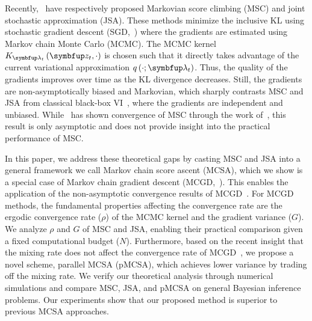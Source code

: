 Recently,~\citet{NEURIPS2020_b2070693,pmlr-v124-ou20a} have respectively proposed Markovian score climbing (MSC) and joint stochastic approximation (JSA).
These methods minimize the inclusive KL using stochastic gradient descent (SGD,~\citealt{robbins_stochastic_1951}) where the gradients are estimated using Markov chain Monte Carlo (MCMC).
The MCMC kernel \(K_{\vlambda_t}\left(\vz_t, \cdot\right)\) is chosen such that it directly takes advantage of the current variational approximation \(q\left(\cdot; \vlambda_t\right)\).
Thus, the quality of the gradients improves over time as the KL divergence decreases.
Still, the gradients are non-asymptotically biased and Markovian, which sharply contrasts MSC and JSA from classical black-box VI~\citep{pmlr-v33-ranganath14, JMLR:v18:16-107}, where the gradients are independent and unbiased.
While~\citet{NEURIPS2020_b2070693} has shown convergence of MSC through the work of~\citet{gu_stochastic_1998}, this result is only asymptotic and does not provide insight into the practical performance of MSC.

%

In this paper, we address these theoretical gaps by casting MSC and JSA into a general framework we call Markov chain score ascent (MCSA), which we show is a special case of Markov chain gradient descent (MCGD,~\citealt{duchi_ergodic_2012}).
This enables the application of the non-asymptotic convergence results of MCGD~\citep{duchi_ergodic_2012, NEURIPS2018_1371bcce, pmlr-v99-karimi19a, doan_finitetime_2020, doan_convergence_2020, Xiong_Xu_Liang_Zhang_2021, debavelaere_convergence_2021}.
For MCGD methods, the fundamental properties affecting the convergence rate are the ergodic convergence rate (\(\rho\)) of the MCMC kernel and the gradient variance (\(G\)).
We analyze \(\rho\) and \(G\) of MSC and JSA, enabling their practical comparison given a fixed computational budget (\(N\)).
Furthermore, based on the recent insight that the mixing rate does not affect the convergence rate of MCGD~\citet{doan_convergence_2020,doan_finitetime_2020}, we propose a novel scheme, parallel MCSA (pMCSA), which achieves lower variance by trading off the mixing rate.
We verify our theoretical analysis through numerical simulations and compare MSC, JSA, and pMCSA on general Bayesian inference problems.
Our experiments show that our proposed method is superior to previous MCSA approaches.

